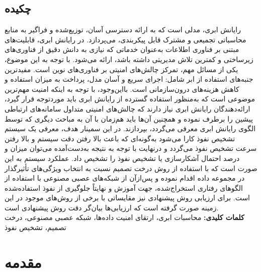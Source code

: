 \documentclass[a4paper,oneside,12pt]{report}
\begin{document}
\section*{چکیده}
\thispagestyle{empty}
رایانش ابری، مدلی است که به ارائه دسترسی آسان، توزیع‌شده و فراگیر به منابع محاسباتی تجمیعی و مشترک قابل پیکربندی، می‌پردازد. در رایانش ابری، قابلیت‌های مبتنی بر فناوری اطلاعات به‌عنوان خدماتی که نیازی به دانش دقیق از فناوری‌های زیرساختی و کمترین تلاش مدیریتی داشته باشد، ارائه می‌شود. با توجه به این موضوع، یکی از مسائل مهم، تمرکز چالش‌های امنیتی بر فناوری‌های نوین است. مفیدترین جنبه‌های استفاده از ابر شامل: اجرای سریع و آسان مدل، پرداخت به میزان استفاده و کاهش هزینه‌های درون‌سازمانی است. بااین‌وجود، با توجه به اینکه امنیت مهم‌ترین موضوعی است که به‌منظور استفاده گسترده از رایانش ابری باید موردتوجه قرار گیرد، ارائه‌دهندگان رایانش ابری نیاز دارند که چالش‌های امنیتی متداول سامانه‌های ارتباطی پیشین را برطرف نموده و همچنین آن‌ها باید هم‌زمان با آن به مباحث دیگری که توسط الگوی رایانش ابری معرفی می‌گردد، بپردازند. در این سمینار هدف، معرفی یک سیستم تشخیص نفوذ کارا می‌شود به‌گونه‌ای که باعث بالا رفتن دقت سیستم و بالا رفتن سرعت تشخیص نفوذ می‌گردد و درنهایت با توجه به نتیجه به‌دست‌آمده می‌توان میزان و درصد احتمال آشکارسازی یا تشخیص نفوذ را تشخیص داد. عملکرد سیستم به این صورت است که با استفاده از روش درخت تصمیم 
نسبت به انتخاب ویژگی‌های تأثیرگذار در مجموعه داده اقدام نموده و پس‌ازآن از شبکه‌های عصبی مصنوعی با استفاده از الگوهای رفتاری استخراج‌شده، جهت آموزش و نهایتاً جلوگیری از نفوذ استفاده‌شده است. برای ارزیابی روش پیشنهادی نیز مقایساتی با برخی از روش‌های موجود در این زمینه صورت گرفته است که ارزیابی‌ها بیان‌گر دقت روش پیشنهادی است.
\\[0.5cm]
\textbf{کلمات کلیدی:}
محاسبات ابری، ارتقای امنیت داده‌ها، شبکه عصبی مصنوعی، درخت تصمیم، تشخیص نفوذ
\newpage
{}
\tableofcontents
\cleardoublepage
\listoftables
\cleardoublepage
\listoffigures
\cleardoublepage
\thispagestyle{empty}
\newpage
{}
\setcounter{page}{1}
\baselineskip=1cm
\chapter{مقدمه}
\end{document}
